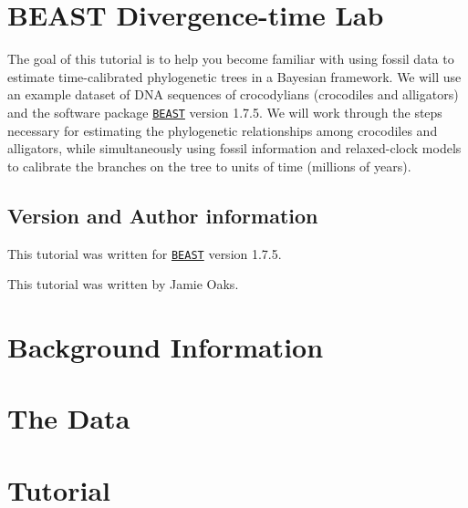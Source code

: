 \documentclass{article}
\newcommand{\beast}{\href{http://beast.bio.ed.ac.uk/Main_Page}{\texttt{BEAST}}\xspace}
\newcommand{\localfile}[1]{\textsf{#1}\xspace}
\newcommand{\subsubItem}[3]{{``#1''}\guillemotright{``#2''}\guillemotright{``#3''}}
\begin{document}
{\singlespacing \tableofcontents}
\newpage
\section{BEAST Divergence-time Lab}

The goal of this tutorial is to help you become familiar with using fossil data
to estimate time-calibrated phylogenetic trees in a Bayesian framework.
We will use an example dataset of DNA sequences of crocodylians (crocodiles and alligators)
and the software package \beast version 1.7.5.
We will work through the steps necessary for estimating the phylogenetic
relationships among crocodiles and alligators, while simultaneously using
fossil information and relaxed-clock models to calibrate the branches on the
tree to units of time (millions of years).

\subsection{Version and Author information}
This tutorial was written for \beast version 1.7.5.

This tutorial was written by Jamie Oaks.

\section{Background Information}

\section{The Data}

\section{Tutorial}
\newcommand{\step}[2]{\addtocounter{stepCounter}{1} {\bf \hypertarget{step\arabic{stepCounter}}{Step \arabic{stepCounter}:}}\xspace #2\par}
\newcommand{\intermediate}[1]{#1}

\end{document}
